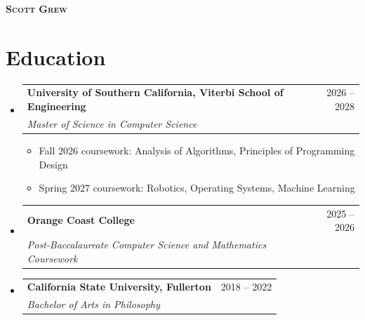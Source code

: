 \documentclass[letterpaper,11pt]{article}
\makeatletter
\newcommand{\resumeItem}[1]{
  \item\small{
    {#1 \vspace{-2pt}}
  }
}
\newcommand{\resumeSubheading}[4]{
  \vspace{-2pt}\item
    \begin{tabular*}{\linewidth}[t]{l@{\extracolsep{\fill}}r}
      \textbf{#1} & #2 \\
      \textit{\small#3} & \textit{\small #4} \\
    \end{tabular*}\vspace{-7pt}
}
\newcommand{\resumeSubHeadingListStart}{\begin{itemize}[leftmargin=0.15in, label={}]}
\newcommand{\resumeSubHeadingListEnd}{\end{itemize}}
\newcommand{\resumeItemListStart}{\begin{itemize}}
\newcommand{\resumeItemListEnd}{\end{itemize}\vspace{-5pt}}
\makeatother
\begin{document}
\begin{center}
    \textbf{\Huge \scshape Scott Grew}
    \end{center}

\section{Education}
  \resumeSubHeadingListStart
    \resumeSubheading
      {University of Southern California, Viterbi School of Engineering}{2026 -- 2028}
      {Master of Science in Computer Science}{}
      \resumeItemListStart
        \resumeItem{Fall 2026 coursework: Analysis of Algorithms, Principles of Programming Design}
        \resumeItem{Spring 2027 coursework: Robotics, Operating Systems, Machine Learning}
      \resumeItemListEnd
    \resumeSubheading
      {Orange Coast College}{2025 -- 2026}
      {Post-Baccalaureate Computer Science and Mathematics Coursework}{}
    \resumeSubheading
      {California State University, Fullerton}{2018 -- 2022}
      {Bachelor of Arts in Philosophy}{}
  \resumeSubHeadingListEnd
\end{document}
